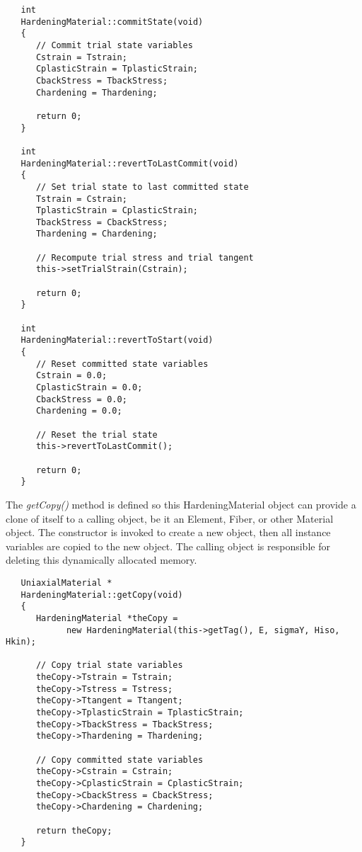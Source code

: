\documentclass[12pt]{article}
\begin{document}
{\sf\small
\begin{verbatim}
   int 
   HardeningMaterial::commitState(void)
   {
      // Commit trial state variables
      Cstrain = Tstrain;
      CplasticStrain = TplasticStrain;
      CbackStress = TbackStress;
      Chardening = Thardening;

      return 0;
   }

   int 
   HardeningMaterial::revertToLastCommit(void)
   {
      // Set trial state to last committed state
      Tstrain = Cstrain;
      TplasticStrain = CplasticStrain;
      TbackStress = CbackStress;
      Thardening = Chardening;

      // Recompute trial stress and trial tangent
      this->setTrialStrain(Cstrain);

      return 0;
   }

   int 
   HardeningMaterial::revertToStart(void)
   {
      // Reset committed state variables
      Cstrain = 0.0;
      CplasticStrain = 0.0;
      CbackStress = 0.0;
      Chardening = 0.0;

      // Reset the trial state
      this->revertToLastCommit();    
    
      return 0;
   }
\end{verbatim}
}

\noindent The {\em getCopy()} method is defined so this HardeningMaterial object can
provide a clone of itself to a calling object, be it an Element, Fiber, or other
Material object. The constructor is invoked to create a new object, then all
instance variables are copied to the new object. The calling object is responsible
for deleting this dynamically allocated memory.

{\sf\small
\begin{verbatim}
   UniaxialMaterial *
   HardeningMaterial::getCopy(void)
   {
      HardeningMaterial *theCopy = 
            new HardeningMaterial(this->getTag(), E, sigmaY, Hiso, Hkin);

      // Copy trial state variables
      theCopy->Tstrain = Tstrain;
      theCopy->Tstress = Tstress;
      theCopy->Ttangent = Ttangent;
      theCopy->TplasticStrain = TplasticStrain;
      theCopy->TbackStress = TbackStress;
      theCopy->Thardening = Thardening;
    
      // Copy committed state variables
      theCopy->Cstrain = Cstrain;
      theCopy->CplasticStrain = CplasticStrain;
      theCopy->CbackStress = CbackStress;
      theCopy->Chardening = Chardening;
    
      return theCopy;
   }
\end{verbatim}
}
\end{document}
